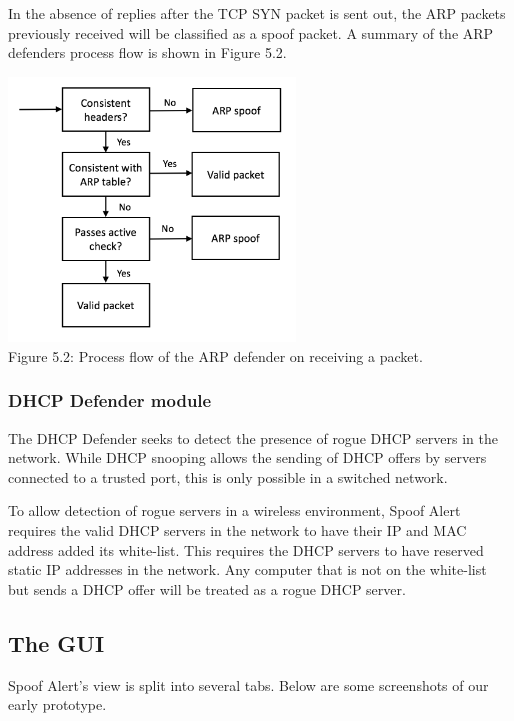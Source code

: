 \documentclass{acm_proc_article-sp}
\begin{document}
In the absence of replies after the TCP SYN packet is sent out, the ARP packets previously received will be classified as a spoof packet. A summary of the ARP defenders process flow is shown in Figure 5.2.

\includegraphics[width=3in]{architecture02.png} \\
Figure 5.2: Process flow of the ARP defender on receiving a packet.

\subsubsection{DHCP Defender module}

The DHCP Defender seeks to detect the presence of rogue DHCP servers in the network. While DHCP snooping allows the sending of DHCP offers by servers connected to a trusted port, this is only possible in a switched network. 

To allow detection of rogue servers in a wireless environment, Spoof Alert requires the valid DHCP servers in the network to have their IP and MAC address added its white-list. This requires the DHCP servers to have reserved static IP addresses in the network. Any computer that is not on the white-list but sends a DHCP offer will be treated as a rogue DHCP server. 

\subsection{The GUI}

Spoof Alert's view is split into several tabs. Below are some screenshots of our early prototype.
\end{document}
